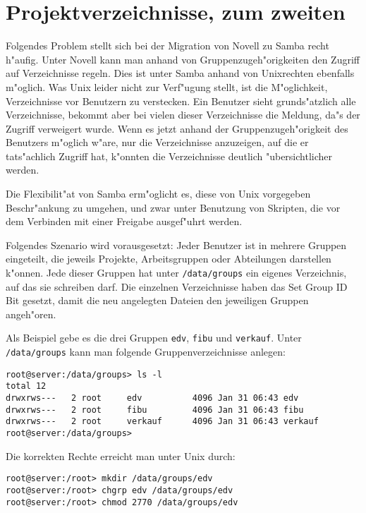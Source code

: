 \documentclass{scrartcl}\usepackage{pslatex}\typearea{12}
\newcommand{\param}{\texttt}
\newcommand{\dateistyle}{\texttt}
\newcommand{\todo}[1]{}
\begin{document}
\todo{Global- und shareparameter, copy = freigabe}

\section{Projektverzeichnisse, zum zweiten}

Folgendes Problem stellt sich bei der Migration von Novell zu Samba
recht h"aufig. Unter Novell kann man anhand von
Gruppenzugeh"origkeiten den Zugriff auf Verzeichnisse regeln. Dies ist
unter Samba anhand von Unixrechten ebenfalls m"oglich. Was Unix leider
nicht zur Verf"ugung stellt, ist die M"oglichkeit, Verzeichnisse vor
Benutzern zu verstecken. Ein Benutzer sieht grunds"atzlich alle
Verzeichnisse, bekommt aber bei vielen dieser Verzeichnisse die
Meldung, da"s der Zugriff verweigert wurde. Wenn es jetzt anhand der
Gruppenzugeh"origkeit des Benutzers m"oglich w"are, nur die
Verzeichnisse anzuzeigen, auf die er tats"achlich Zugriff hat,
k"onnten die Verzeichnisse deutlich "ubersichtlicher werden.

Die Flexibilit"at von Samba erm"oglicht es, diese von Unix
vorgegeben Beschr"ankung zu umgehen, und zwar unter Benutzung von
Skripten, die vor dem Verbinden mit einer Freigabe ausgef"uhrt werden.

Folgendes Szenario wird vorausgesetzt: Jeder Benutzer ist in mehrere
Gruppen eingeteilt, die jeweils Projekte, Arbeitsgruppen oder
Abteilungen darstellen k"onnen. Jede dieser Gruppen hat unter
\dateistyle{/data/groups} ein eigenes Verzeichnis, auf das sie schreiben
darf. Die einzelnen Verzeichnisse haben das Set Group ID Bit gesetzt,
damit die neu angelegten Dateien den jeweiligen Gruppen angeh"oren.

Als Beispiel gebe es die drei Gruppen \param{edv}, \param{fibu} und
\param{verkauf}. Unter \dateistyle{/data/groups} kann man folgende
Gruppenverzeichnisse anlegen:

{\small\begin{verbatim}
root@server:/data/groups> ls -l
total 12
drwxrws---   2 root     edv          4096 Jan 31 06:43 edv
drwxrws---   2 root     fibu         4096 Jan 31 06:43 fibu
drwxrws---   2 root     verkauf      4096 Jan 31 06:43 verkauf
root@server:/data/groups>
\end{verbatim}
}

Die korrekten Rechte erreicht man unter Unix durch:

{\small\begin{verbatim}
root@server:/root> mkdir /data/groups/edv
root@server:/root> chgrp edv /data/groups/edv
root@server:/root> chmod 2770 /data/groups/edv
\end{verbatim}
}
\end{document}
